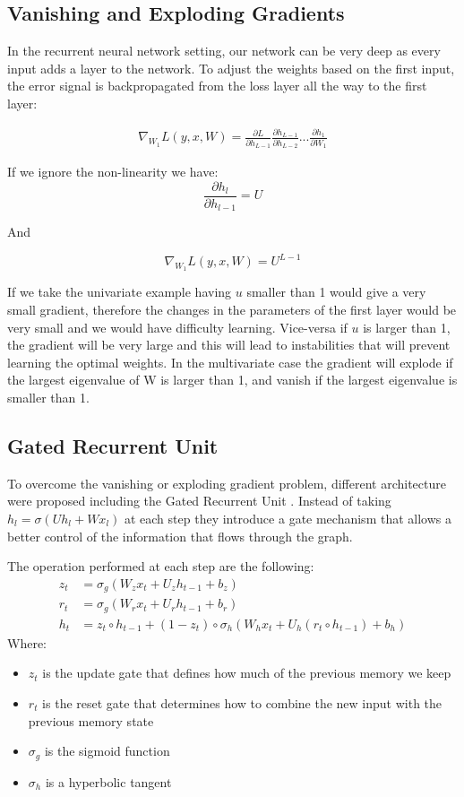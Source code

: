 \documentclass[11pt,oneside,openright]{report}
\begin{document}
\subsection{Vanishing and Exploding Gradients}
In the recurrent neural network setting, our network can be very deep as every input adds a layer to the network. To adjust the weights based on the first input, the error signal is backpropagated from the loss layer all the way to the first layer: 

 \begin{align}
   \nabla_{W_1} L(y, x, W) = \frac{\partial L}{\partial h_{L-1}} \frac{\partial h_{L-1}}{\partial h_{L-2}} ... \frac{\partial h_1}{\partial W_1}
 \end{align}
 
 If we ignore the non-linearity we have:
 $$ \frac{\partial h_{l}}{\partial h_{l-1}} = U $$
 
 And 
 
 $$ \nabla_{W_1} L(y, x, W) = U^{L-1}$$
 
 If we take the univariate example having $u$ smaller than 1 would give a very small gradient, therefore the changes in the parameters of the first layer would be very small and we would have difficulty learning. Vice-versa if $u$ is larger than 1, the gradient will be very large and this will lead to instabilities that will prevent learning the optimal weights. In the multivariate case the gradient will explode if the largest eigenvalue of W is larger than 1, and vanish if the largest eigenvalue is smaller than 1.

\subsection{Gated Recurrent Unit}
To overcome the vanishing or exploding gradient problem, different architecture were proposed including the Gated Recurrent Unit \cite{gru}. Instead of taking $h_l = \sigma(U h_l + W x_l)$ at each step they introduce a gate mechanism that allows a better control of the information that flows through the graph.

The operation performed at each step are the following:
\begin{align}
z_t &= \sigma_g(W_{z} x_t + U_{z} h_{t-1} + b_z) \\
r_t &= \sigma_g(W_{r} x_t + U_{r} h_{t-1} + b_r) \\
h_t &=  z_t \circ h_{t-1} + (1-z_t) \circ \sigma_h(W_{h} x_t + U_{h} (r_t \circ h_{t-1}) + b_h)
\end{align}
Where:
\begin{itemize}
 \item $z_t$ is the update gate that defines how much of the previous memory we keep
 \item $r_t$ is the reset gate that determines how to combine the new input with the previous memory state
\item  $\sigma_g$ is the sigmoid function
\item $\sigma_h$ is a hyperbolic tangent
\end{itemize}
\end{document}
